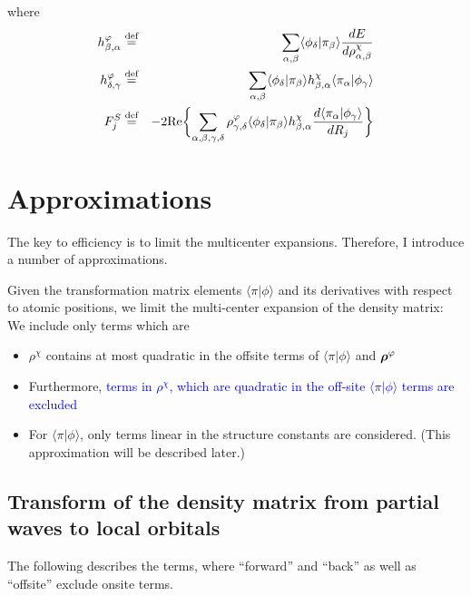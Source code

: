 \documentclass[11pt,a4paper]{report}
\begin{document}
where
\begin{eqnarray}
h^{\varphi}_{\beta,\alpha}
&\defas&\sum_{\alpha,\beta}
\langle\phi_\delta|\pi_\beta\rangle
\frac{dE}{d\rho^{\chi}_{\alpha,\beta}}
\nonumber\\
%
%
h^{\varphi}_{\delta,\gamma}
&\defas&
\sum_{\alpha,\beta}
\langle\phi_\delta|\pi_\beta\rangle
h^{\chi}_{\beta,\alpha}
\langle\pi_\alpha|\phi_\gamma\rangle
\nonumber\\
%
%
F^{S}_j&\defas&
-2\Re\biggl\lbrace
\sum_{\alpha,\beta,\gamma,\delta}
\rho^{\varphi}_{\gamma,\delta}
\langle\phi_\delta|\pi_\beta\rangle
h^{\chi}_{\beta,\alpha}
\frac{d\langle\pi_\alpha|\phi_\gamma\rangle}{dR_j}
\biggr\rbrace
\end{eqnarray}


\section{Approximations}
The key to efficiency is to limit the multicenter
expansions. Therefore, I introduce a number of approximations.

Given the transformation matrix elements $\langle\pi|\phi\rangle$ and
its derivatives with respect to atomic positions, we limit the
multi-center expansion of the density matrix: We include only terms
which are
\begin{itemize}
\item $\rho^\chi$ contains at most quadratic in the offsite terms of
  $\langle\pi|\phi\rangle$ and $\bm{\rho}^{\varphi}$ 
\item Furthermore, \textcolor{blue}{terms in $\rho^\chi$, which are
  quadratic in the off-site $\langle\pi|\phi\rangle$ terms are
  excluded}
\item For $\langle\pi|\phi\rangle$, only terms linear in the structure
  constants are considered. (This approximation will be described
  later.)
\end{itemize}

\subsection{Transform of the density matrix from partial waves 
to local orbitals}
The following describes the terms, where ``forward'' and ``back'' as
well as ``offsite'' exclude onsite terms.
\end{document}
